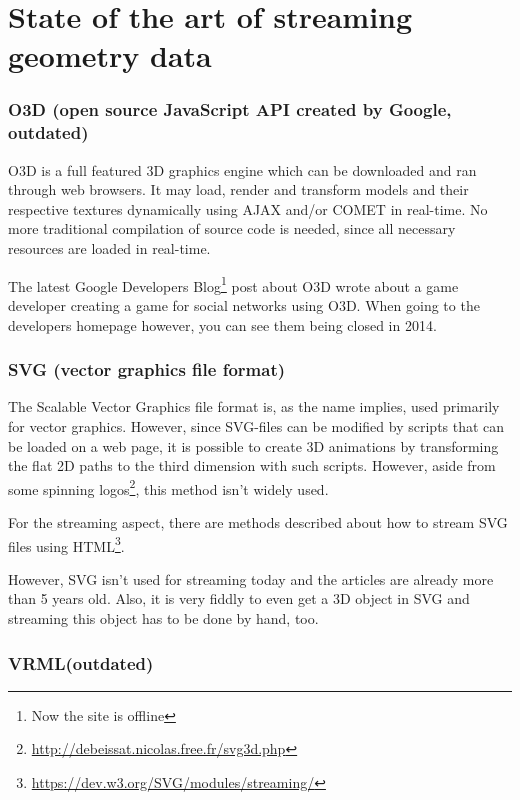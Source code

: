 \documentclass[%
aip,
jmp,
amsmath,amssymb,
reprint,
nofootinbib
]{revtex4-1}
\begin{document}
	\section{State of the art of streaming geometry data}
	
	\subsubsection{O3D (open source JavaScript API created by Google, outdated)}
	
	O3D is a full featured 3D graphics engine which can be downloaded and ran through web browsers. It may load, render and transform models and their respective textures dynamically using AJAX and/or COMET in real-time. No more traditional compilation of source code is needed, since all necessary resources are loaded in real-time.
	
	The latest Google Developers Blog\footnote{Now the site is offline} post about O3D wrote about a game developer creating a game for social networks using O3D. When going to the developers homepage however, you can see them being closed in 2014.
	
	\subsubsection{SVG (vector graphics file format)}
	
	The Scalable Vector Graphics file format is, as the name implies, used primarily for vector graphics. However, since SVG-files can be modified by scripts that can be loaded on a web page, it is possible to create 3D animations by transforming the flat 2D paths to the third dimension with such scripts. However, aside from some spinning logos\footnote{\url{http://debeissat.nicolas.free.fr/svg3d.php}}, this method isn't widely used.
	
	For the streaming aspect, there are methods described about how to stream SVG files using HTML\footnote{\url{https://dev.w3.org/SVG/modules/streaming/}}.
	
	However, SVG isn't used for streaming today and the articles are already more than 5 years old. Also, it is very fiddly to even get a 3D object in SVG and streaming this object has to be done by hand, too.
	
	\subsubsection{VRML(outdated)}
	
\end{document}
